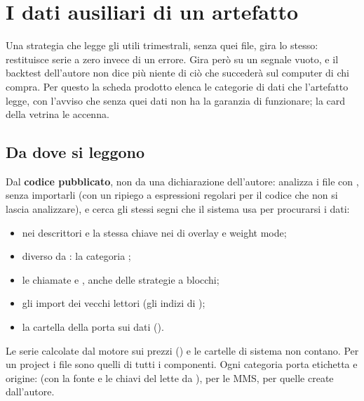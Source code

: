 \section{I dati ausiliari di un artefatto}\label{sez:dati-ausiliari}

Una strategia che legge gli utili trimestrali, senza quei file, gira lo
stesso:  restituisce serie a zero invece di un
errore. Gira però su un segnale vuoto, e il backtest dell'autore non dice più
niente di ciò che succederà sul computer di chi compra. Per questo la scheda
prodotto elenca le categorie di dati che l'artefatto legge, con l'avviso che
senza quei dati non ha la garanzia di funzionare; la card della vetrina le
accenna.

\subsection{Da dove si leggono}

Dal \textbf{codice pubblicato}, non da una dichiarazione dell'autore:
 analizza i file con , senza
importarli (con un ripiego a espressioni regolari per il codice che non si
lascia analizzare), e cerca gli stessi segni che il sistema usa per
procurarsi i dati:

\begin{itemize}
  \item {} nei descrittori e la stessa chiave
    nei  di overlay e weight mode;
  \item {} diverso da : la categoria
    ;
  \item le chiamate  e
    , anche delle strategie a blocchi;
  \item gli import dei vecchi lettori (gli indizi di
    );
  \item la cartella  della porta sui dati ().
\end{itemize}

\noindent
Le serie calcolate dal motore sui prezzi () e le
cartelle di sistema non contano. Per un project i file sono quelli di tutti i
componenti. Ogni categoria porta etichetta e origine:  (con la
fonte e le chiavi del  lette da ),  per
le MMS,  per quelle create dall'autore.


